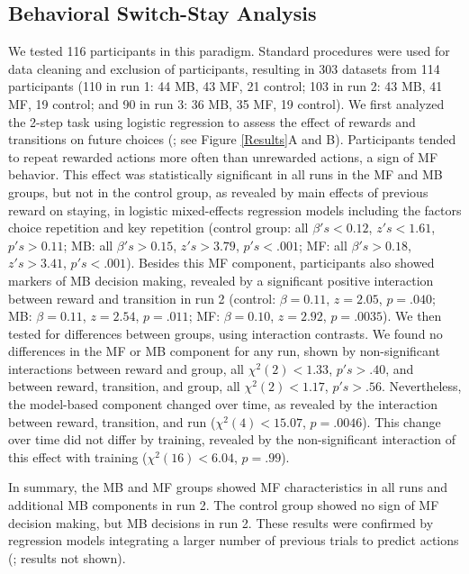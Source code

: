 \documentclass[11pt]{article} %
\begin{document}
\subsection{Behavioral Switch-Stay Analysis}
We tested 116 participants in this paradigm. Standard procedures were used for data cleaning and exclusion of participants, resulting in 303 datasets from 114 participants (110 in run 1: 44 MB, 43 MF, 21 control; 103 in run 2: 43 MB, 41 MF, 19 control; and 90 in run 3: 36 MB, 35 MF, 19 control). We first analyzed the 2-step task using logistic regression to assess the effect of rewards and transitions on future choices (\cite{akam_simple_2015}; see Figure \ref{Results}A and B). Participants tended to repeat rewarded actions more often than unrewarded actions, a sign of MF behavior. This effect was statistically significant in all runs in the MF and MB groups, but not in the control group, as revealed by main effects of previous reward on staying, in logistic mixed-effects regression models including the factors choice repetition and key repetition (control group: all $\beta's < 0.12$, $z's < 1.61$, $p's > 0.11$; MB: all $\beta's > 0.15$, $z's > 3.79$, $p's < .001$; MF: all $\beta's > 0.18$, $z's > 3.41$, $p's < .001$). Besides this MF component, participants also showed markers of MB decision making, revealed by a significant positive interaction between reward and transition in run 2 (control: $\beta = 0.11$, $z = 2.05$, $p = .040$; MB: $\beta = 0.11$, $z = 2.54$, $p = .011$; MF: $\beta = 0.10$, $z = 2.92$, $p = .0035$). We then tested for differences between groups, using interaction contrasts. We found no differences in the MF or MB component for any run, shown by non-significant interactions between reward and group, all $\chi^{2}(2) < 1.33$, $p's > .40$, and between reward, transition, and group, all $\chi^{2}(2) < 1.17$, $p's > .56$. Nevertheless, the model-based component changed over time, as revealed by the interaction between reward, transition, and run ($\chi^{2}(4) < 15.07$, $p = .0046$). This change over time did not differ by training, revealed by the non-significant interaction of this effect with training ($\chi^{2}(16) < 6.04$, $p = .99$). %

In summary, the MB and MF groups showed MF characteristics in all runs and additional MB components in run 2. The control group showed no sign of MF decision making, but MB decisions in run 2. These results were confirmed by regression models integrating a larger number of previous trials to predict actions (\cite{akam_simple_2015}; results not shown).
\end{document}

